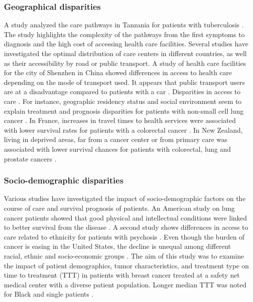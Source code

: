 \subsubsection{Geographical disparities}


A study analyzed the care pathways in Tanzania for patients with tuberculosis
\cite{mhalu_pathways_2019}. The study highlights the complexity of the pathways
from the first symptoms to diagnosis and the high cost of accessing health care
facilities. Several studies have investigated the optimal distribution of care
centers in different countries, as well as their accessibility by road or public
transport. A study of health care facilities for the city of Shenzhen in China
showed differences in access to health care depending on the mode of transport
used. It appears that public transport users are at a disadvantage compared to
patients with a car \cite{tao_spatial_2018}.
Disparities in access to care \cite{weiss_global_2020}.
For instance, geographic residency status and social environment seem
to explain treatment and prognosis disparities for patients with non-small cell
lung cancer \cite{johnson_treatment_2014}. In France, increases in travel times
to health services were associated with lower survival rates for patients with a
colorectal cancer \cite{dejardin_influence_2014}. In New Zealand, living in
deprived areas, far from a cancer center or from primary care was associated
with lower survival chances for patients with colorectal, lung and prostate
cancers \cite{haynes_cancer_2008}.

\subsubsection{Socio-demographic disparities}


Various studies have investigated the impact of socio-demographic factors on the
course of care and survival prognosis of patients. An American study on lung
cancer patients showed that good physical and intellectual conditions were
linked to better survival from the disease
\cite{pierzynski_socio-demographic_2018}. A second study shows differences in
access to care related to ethnicity for patients with psychosis
\cite{anderson_meta-analysis_2014}. Even though the burden of cancer is easing
in the United States, the decline is unequal among different racial, ethnic and
socio-economic groups \cite{viswanath_science_2005}. The aim of this study was
to examine the impact of patient demographics, tumor characteristics, and
treatment type on time to treatment (TTT) in patients with breast cancer treated
at a safety net medical center with a diverse patient population. Longer median
TTT was noted for Black and single patients \cite{khanna_impact_2017}.

